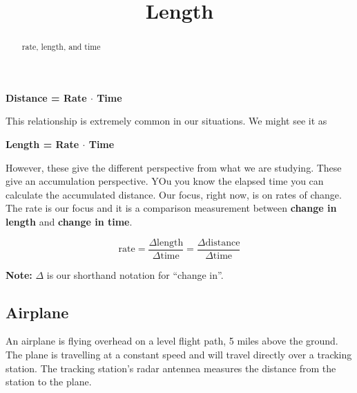 \documentclass{ximera}
\title{Length}
\begin{document}
\begin{abstract}
rate, length, and time
\end{abstract}
\maketitle




\begin{center}
\textbf{\textcolor{purple!85!blue}{Distance = Rate $\cdot$ Time}} 
\end{center}

This relationship is extremely common in our situations.  We might see it as



\begin{center}
\textbf{\textcolor{purple!85!blue}{Length = Rate $\cdot$ Time}} 
\end{center}



However, these give the different perspective from what we are studying.  These give an accumulation perspective. YOu you know the elapsed time you can calculate the accumulated distance.  Our focus, right now, is on rates of change. \\


The rate is our focus and it is a comparison measurement between \textbf{\textcolor{red!80!black}{change in length}} and \textbf{\textcolor{red!80!black}{change in time}}.



\[
\text{rate} = \frac{\Delta \text{length}}{\Delta \text{time}} = \frac{\Delta \text{distance}}{\Delta \text{time}}
\]

\textbf{Note:} $\Delta$ is our shorthand notation for ``change in''. \\






\subsection{Airplane}

An airplane is flying overhead on a level flight path, 5 miles above the ground.  The plane is travelling at a constant speed and will travel directly over a tracking station. The tracking station's radar antennea measures the distance from the station to the plane.
\end{document}
